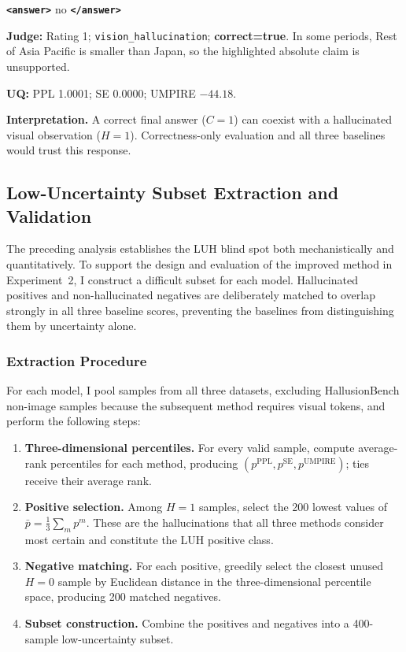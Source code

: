 \begin{table}[!tbp]
\begin{casecard}
\begin{minipage}[t]{0.58\linewidth}
\medskip
\textbf{\texttt{<answer>}} no \textbf{\texttt{</answer>}}

\medskip
\textbf{Judge:} Rating 1; \texttt{vision\_hallucination}; \textbf{correct=true}. In some periods, Rest of Asia Pacific is smaller than Japan, so the highlighted absolute claim is unsupported.

\medskip
\colorbox{gray!12}{\parbox{0.95\linewidth}{\textbf{UQ:} PPL 1.0001; SE 0.0000; UMPIRE $-44.18$.}}
\end{minipage}

\medskip
\textbf{Interpretation.} A correct final answer ($C=1$) can coexist with a hallucinated visual observation ($H=1$). Correctness-only evaluation and all three baselines would trust this response.
\end{casecard}
\end{table}

\FloatBarrier

\subsection{Low-Uncertainty Subset Extraction and Validation}
\label{subsec:luh_subset}

The preceding analysis establishes the LUH blind spot both mechanistically and quantitatively. To support the design and evaluation of the improved method in Experiment~2, I construct a difficult subset for each model. Hallucinated positives and non-hallucinated negatives are deliberately matched to overlap strongly in all three baseline scores, preventing the baselines from distinguishing them by uncertainty alone.

\subsubsection{Extraction Procedure}

For each model, I pool samples from all three datasets, excluding HallusionBench non-image samples because the subsequent method requires visual tokens, and perform the following steps:

\begin{enumerate}[leftmargin=2em]
\item \textbf{Three-dimensional percentiles.} For every valid sample, compute average-rank percentiles for each method, producing $(p^{\mathrm{PPL}},p^{\mathrm{SE}},p^{\mathrm{UMPIRE}})$; ties receive their average rank.
\item \textbf{Positive selection.} Among $H=1$ samples, select the 200 lowest values of $\bar p=\frac{1}{3}\sum_m p^m$. These are the hallucinations that all three methods consider most certain and constitute the LUH positive class.
\item \textbf{Negative matching.} For each positive, greedily select the closest unused $H=0$ sample by Euclidean distance in the three-dimensional percentile space, producing 200 matched negatives.
\item \textbf{Subset construction.} Combine the positives and negatives into a 400-sample low-uncertainty subset.
\end{enumerate}

